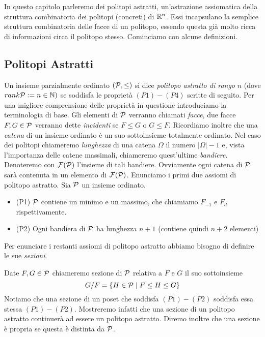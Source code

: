 In questo capitolo parleremo dei politopi astratti, un'astrazione assiomatica 
della struttura combinatoria dei politopi (concreti) di $\mathbb{R}^n$. Essi incapsulano 
la semplice struttura combinatoria delle facce di un politopo, essendo questa 
gi\`a molto ricca di informazioni circa il politopo stesso. Cominciamo con 
alcune 
definizioni.





\subsection{Politopi Astratti}
Un insieme parzialmente ordinato $(\mathcal{P},\leq)$ si dice \emph{politopo astratto di 
rango} $n$ (dove $rank\mathcal{P}:=n\in\mathbb{N})$ se soddisfa le propriet\`a 
$(P1)-(P4)$ scritte 
di seguito. Per una migliore comprensione delle propriet\`a in questione 
introduciamo la terminologia di base. Gli elementi di $\mathcal{P}$ verranno chiamati 
\emph{facce}, due facce $F,G\in\mathcal{P}$ verranno dette \emph{incidenti} se $F\leq G$ o $G\leq F$. 
Ricordiamo inoltre che una \emph{catena} di un insieme ordinato \`e un suo 
sottoinsieme totalmente ordinato. Nel caso dei politopi chiameremo 
\emph{lunghezza} di una catena $\Omega$ il numero $\left|\Omega\right|-1$ e, 
vista l'importanza delle catene massimali, chiameremo quest'ultime \emph{bandiere}.
Denoteremo con $\mathcal{F}(\mathcal{P})$ l'insieme di tali bandiere. Ovviamente ogni 
catena di $\mathcal{P}$ sar\`a contenuta in un elemento di $\mathcal{F}(\mathcal{P})$.
Enunciamo i primi due assiomi di politopo astratto. Sia $\mathcal{P}$ un insieme 
ordinato.


\begin{itemize}
\item (P1) $\mathcal{P}$ contiene un minimo e un massimo, che chiamiamo $F_{-1}$ e $F_d$ 
rispettivamente.
\item (P2) Ogni bandiera di $\mathcal{P}$ ha lunghezza $n+1$ (contiene quindi $n+2$ 
elementi)
\end{itemize}



Per enunciare i restanti assiomi di politopo astratto abbiamo bisogno di 
definire le sue \emph{sezioni}.

\begin{defin}
Date $F,G\in\mathcal{P}$ chiameremo sezione di $\mathcal{P}$ relativa a $F$ e $G$ il suo 
sottoinsieme
\begin{equation*}
G/F=\left\{H\in\mathcal{P}\mid F\leq H\leq G\right\}
\end{equation*}
Notiamo che una sezione di un poset che soddisfa $(P1)-(P2)$ soddisfa essa 
stessa $(P1)-(P2)$. Mostreremo infatti che una sezione di un politopo astratto
continuer\`a ad essere un politopo astratto. Diremo inoltre che una sezione \`e 
propria se questa \`e distinta da $\mathcal{P}$.
\end{defin}

